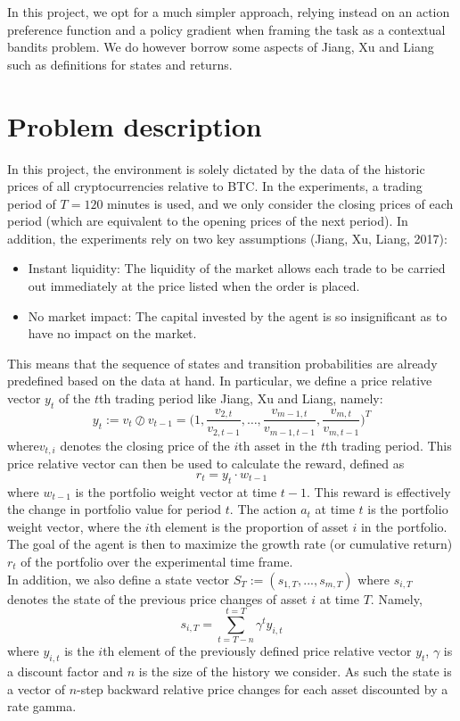 \documentclass[a4paper,12pt]{article}
\begin{document}
In this project, we opt for a much simpler approach, relying instead on an action preference function and a policy gradient when framing the task as a contextual bandits problem. We do however borrow some aspects of Jiang, Xu and Liang such as definitions for states and returns. \\

\section{Problem description}
In this project, the environment is solely dictated by the data of the historic prices of all cryptocurrencies relative to BTC. In the experiments, a trading period of $T = 120$ minutes is used, and we only consider the closing prices of each period (which are equivalent to the opening prices of the next period). In addition, the experiments rely on two key assumptions (Jiang, Xu, Liang, 2017):

\begin{itemize}
  \item Instant liquidity: The liquidity of the market allows each trade to be carried out immediately at the price listed when the order is placed.
  \item No market impact: The capital invested by the agent is so insignificant as to have no impact on the market.
\end{itemize}

This means that the sequence of states and transition probabilities are already predefined based on the data at hand. In particular, we define a price relative vector $y_t$ of the $t$th trading period like Jiang, Xu and Liang, namely:
$$y_t := v_t \oslash v_{t-1} = \bigg(1,\frac{v_{2,t}}{v_{2,t-1}}, …,\frac{v_{m-1,t}}{v_{m-1,t-1}}, \frac{v_{m,t}}{v_{m,t-1}}\bigg)^T$$ 
where$ v_{t,i}$ denotes the closing price of the $i$th asset in the $t$th trading period. This price relative vector can then be used to calculate the reward, defined as 
$$r_t = y_t \cdot w_{t-1}$$
where $w_{t-1}$ is the portfolio weight vector at time $t-1$. This reward is effectively the change in portfolio value for period $t$. The action $a_t$ at time $t$ is the portfolio weight vector, where the $i$th element is the proportion of asset $i$ in the portfolio. The goal of the agent is then to maximize the growth rate (or cumulative return) $r_t$ of the portfolio over the experimental time frame. \\

In addition, we also define a state vector $S_T := (s_{1,T},...,s_{m,T})$ where $s_{i,T}$ denotes the state of the previous price changes of asset $i$ at time $T$. Namely,
$$s_{i,T} = \sum_{t=T-n}^{t=T} \gamma^t y_{i,t}$$ 
where $y_{i,t}$ is the $i$th element of the previously defined price relative vector $y_t$, $\gamma$ is a discount factor and $n$ is the size of the history we consider. As such the state is a vector of $n$-step backward relative price changes for each asset discounted by a rate gamma. 
\end{document}
